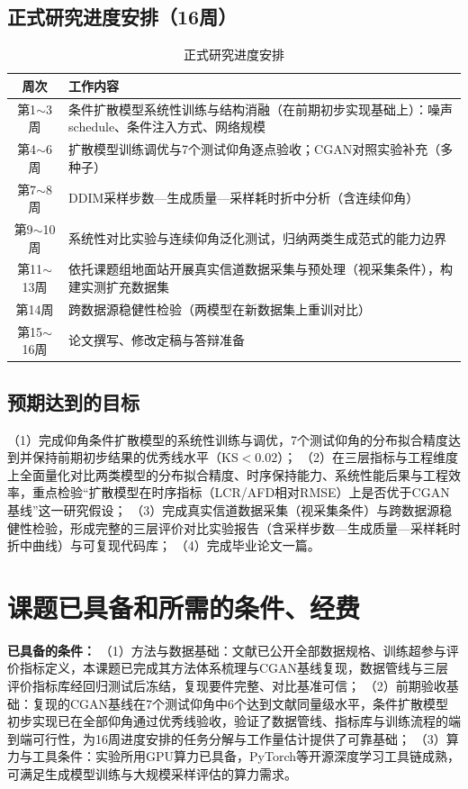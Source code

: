 \documentclass[12pt, a4paper]{ctexart}
\begin{document}
\subsection{正式研究进度安排（16周）}
\begin{table}[H]
\centering\small
\caption{正式研究进度安排}
\label{tab:schedule}
\begin{tabular}{c p{}}
\toprule
周次 & 工作内容\\
\midrule
第1$\sim$3周 & 条件扩散模型系统性训练与结构消融（在前期初步实现基础上）：噪声schedule、条件注入方式、网络规模\\
第4$\sim$6周 & 扩散模型训练调优与7个测试仰角逐点验收；CGAN对照实验补充（多种子）\\
第7$\sim$8周 & DDIM采样步数—生成质量—采样耗时折中分析（含连续仰角）\\
第9$\sim$10周 & 系统性对比实验与连续仰角泛化测试，归纳两类生成范式的能力边界\\
第11$\sim$13周 & 依托课题组地面站开展真实信道数据采集与预处理（视采集条件），构建实测扩充数据集\\
第14周 & 跨数据源稳健性检验（两模型在新数据集上重训对比）\\
第15$\sim$16周 & 论文撰写、修改定稿与答辩准备\\
\bottomrule
\end{tabular}
\end{table}

\subsection{预期达到的目标}
（1）完成仰角条件扩散模型的系统性训练与调优，7个测试仰角的分布拟合精度达到并保持前期初步结果的优秀线水平（KS$<0.02$）；
（2）在三层指标与工程维度上全面量化对比两类模型的分布拟合精度、时序保持能力、系统性能后果与工程效率，重点检验“扩散模型在时序指标（LCR/AFD相对RMSE）上是否优于CGAN基线”这一研究假设；
（3）完成真实信道数据采集（视采集条件）与跨数据源稳健性检验，形成完整的三层评价对比实验报告（含采样步数—生成质量—采样耗时折中曲线）与可复现代码库；
（4）完成毕业论文一篇。

\section{课题已具备和所需的条件、经费}

\textbf{已具备的条件：}
（1）方法与数据基础：文献\cite{chen2026cgan}已公开全部数据规格、训练超参与评价指标定义，本课题已完成其方法体系梳理与CGAN基线复现，数据管线与三层评价指标库经回归测试后冻结，复现要件完整、对比基准可信；
（2）前期验收基础：复现的CGAN基线在7个测试仰角中6个达到文献\cite{chen2026cgan}同量级水平，条件扩散模型初步实现已在全部仰角通过优秀线验收，验证了数据管线、指标库与训练流程的端到端可行性，为16周进度安排的任务分解与工作量估计提供了可靠基础；
（3）算力与工具条件：实验所用GPU算力已具备，PyTorch等开源深度学习工具链成熟，可满足生成模型训练与大规模采样评估的算力需求。
\end{document}
